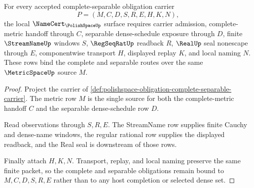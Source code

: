 \begin{theorem}
\label{thm:polishspace-complete-separable-namecert-obligations}
For every accepted complete-separable obligation carrier
$$
P=(M,C,D,S,R,E,H,K,N),
$$
the local $\NameCert_{\PolishSpaceUp}$ surface requires carrier admission, complete-metric handoff through $C$, separable dense-schedule exposure through $D$, finite $\StreamNameUp$ windows $S$, $\RegSeqRatUp$ readback $R$, $\RealUp$ seal nonescape through $E$, componentwise transport $H$, displayed replay $K$, and local naming $N$. These rows bind the complete and separable routes over the same $\MetricSpaceUp$ source $M$.
\end{theorem}
\begin{proof}
Project the carrier of \autoref{def:polishspace-obligation-complete-separable-carrier}. The metric row $M$ is the single source for both the complete-metric handoff $C$ and the separable dense-schedule row $D$.

Read observations through $S,R,E$. The StreamName row supplies finite Cauchy and dense-name windows, the regular rational row supplies the displayed readback, and the Real seal is downstream of those rows.

Finally attach $H,K,N$. Transport, replay, and local naming preserve the same finite packet, so the complete and separable obligations remain bound to $M,C,D,S,R,E$ rather than to any host completion or selected dense set.
\end{proof}

